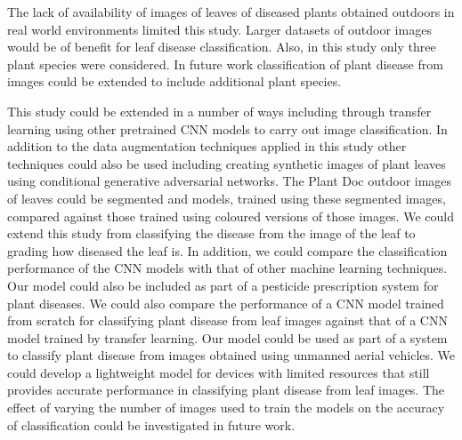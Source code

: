 \documentclass[conference]{IEEEtran}
\begin{document}
The lack of availability of images of leaves of diseased plants obtained outdoors in real world environments limited this study. Larger datasets of outdoor images would be of benefit for leaf disease classification. Also, in this study only three plant species were considered. In future work classification of plant disease from images could be extended to include additional plant species.

This study could be extended in a number of ways including through transfer learning using other pretrained CNN models to carry out image classification. In addition to the data augmentation techniques applied in this study other techniques could also be used including creating synthetic images of plant leaves using conditional generative adversarial networks. The Plant Doc outdoor images of leaves could be segmented and models, trained using these segmented images, compared against those trained using coloured versions of those images. We could extend this study from classifying the disease from the image of the leaf to grading how diseased the leaf is. In addition, we could compare the classification performance of the CNN models with that of other machine learning techniques. Our model could also be included as part of a pesticide prescription system for plant diseases. We could also compare the performance of a CNN model trained from scratch for classifying plant disease from leaf images against that of a CNN model trained by transfer learning. Our model could be used as part of a system to classify plant disease from images obtained using unmanned aerial vehicles. We could develop a lightweight model for devices with limited resources that still provides accurate performance in classifying plant disease from leaf images. The effect of varying the number of images used to train the models on the accuracy of classification could be investigated in future work.         




\end{document}

